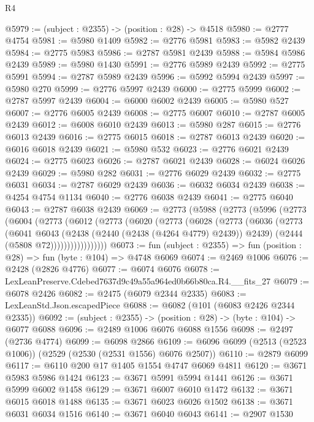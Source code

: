 \begin{lexlean}{R4}
\begin{coremodule}
@5979 := (subject : @2355) -> (position : @28) -> @4518
@5980 := @2777 @4754
@5981 := @5980 @1409
@5982 := @2776 @5981
@5983 := @5982 @2439
@5984 := @2775 @5983
@5986 := @2787 @5981 @2439
@5988 := @5984 @5986 @2439
@5989 := @5980 @1430
@5991 := @2776 @5989 @2439
@5992 := @2775 @5991
@5994 := @2787 @5989 @2439
@5996 := @5992 @5994 @2439
@5997 := @5980 @270
@5999 := @2776 @5997 @2439
@6000 := @2775 @5999
@6002 := @2787 @5997 @2439
@6004 := @6000 @6002 @2439
@6005 := @5980 @527
@6007 := @2776 @6005 @2439
@6008 := @2775 @6007
@6010 := @2787 @6005 @2439
@6012 := @6008 @6010 @2439
@6013 := @5980 @287
@6015 := @2776 @6013 @2439
@6016 := @2775 @6015
@6018 := @2787 @6013 @2439
@6020 := @6016 @6018 @2439
@6021 := @5980 @532
@6023 := @2776 @6021 @2439
@6024 := @2775 @6023
@6026 := @2787 @6021 @2439
@6028 := @6024 @6026 @2439
@6029 := @5980 @282
@6031 := @2776 @6029 @2439
@6032 := @2775 @6031
@6034 := @2787 @6029 @2439
@6036 := @6032 @6034 @2439
@6038 := @4254 @4754 @1134
@6040 := @2776 @6038 @2439
@6041 := @2775 @6040
@6043 := @2787 @6038 @2439
@6069 := @2773
    (@5988
      (@2773
        (@5996
          (@2773
            (@6004
              (@2773
                (@6012
                  (@2773
                    (@6020
                      (@2773
                        (@6028
                          (@2773
                            (@6036
                              (@2773
                                (@6041
                                  @6043
                                  (@2438 (@2440 (@2438 (@4264 @4779) @2439)) @2439)
                                  (@2444 (@5808 @72)))))))))))))))))
@6073 := fun (subject : @2355) => fun (position : @28) => fun (byte : @104) => @4748 @6069
@6074 := @2469 @1006
@6076 := @2428 (@2826 @4776)
@6077 := @6074 @6076
@6078 := LexLeanPreserve.Cdebed7637d9c49a55a964ed0b66b80ca.R4.__fits_27
@6079 := @6078 @2426
@6082 := @2475 (@6079 @2344 @2335)
@6083 := LexLeanStd.Json.escapedPiece
@6088 := @6082 (@101 (@6083 @2426 @2344 @2335))
@6092 := (subject : @2355) -> (position : @28) -> (byte : @104) -> @6077 @6088
@6096 := @2489 @1006 @6076 @6088 @1556
@6098 := @2497 (@2736 @4774)
@6099 := @6098 @2866
@6109 := @6096 @6099 (@2513 (@2523 @1006)) (@2529 (@2530 (@2531 @1556) @6076 @2507))
@6110 := @2879 @6099
@6117 := @6110 @200 @17 @1405 @1554 @4747 @6069 @4811
@6120 := @3671 @5983 @5986 @1424
@6123 := @3671 @5991 @5994 @1441
@6126 := @3671 @5999 @6002 @1458
@6129 := @3671 @6007 @6010 @1472
@6132 := @3671 @6015 @6018 @1488
@6135 := @3671 @6023 @6026 @1502
@6138 := @3671 @6031 @6034 @1516
@6140 := @3671 @6040 @6043
@6141 := @2907 @1530

\end{coremodule}
\end{lexlean}
